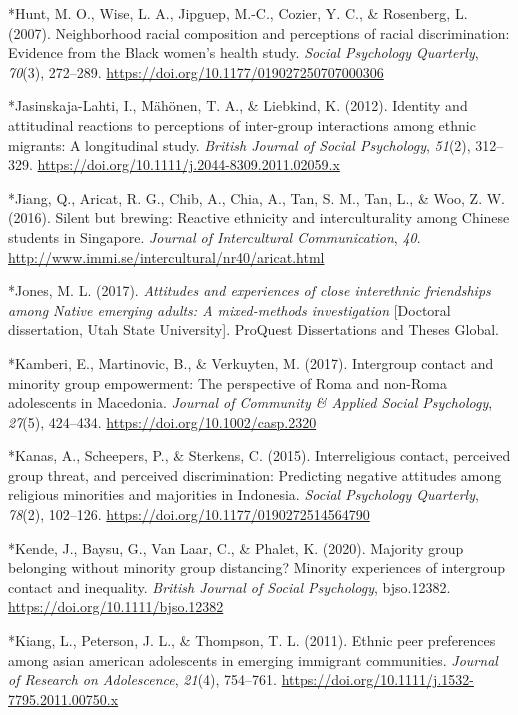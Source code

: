 \documentclass[12pt, letterpaper]{article}
\begin{document}
\leavevmode\hypertarget{ref-2001}{}%
*Hunt, M. O., Wise, L. A., Jipguep, M.-C., Cozier, Y. C., \& Rosenberg,
L. (2007). Neighborhood racial composition and perceptions of racial
discrimination: Evidence from the Black women's health study.
\emph{Social Psychology Quarterly}, \emph{70}(3), 272--289.
\url{https://doi.org/10.1177/019027250707000306}

\leavevmode\hypertarget{ref-2341}{}%
*Jasinskaja-Lahti, I., Mähönen, T. A., \& Liebkind, K. (2012). Identity
and attitudinal reactions to perceptions of inter-group interactions
among ethnic migrants: A longitudinal study. \emph{British Journal of
Social Psychology}, \emph{51}(2), 312--329.
\url{https://doi.org/10.1111/j.2044-8309.2011.02059.x}

\leavevmode\hypertarget{ref-19}{}%
*Jiang, Q., Aricat, R. G., Chib, A., Chia, A., Tan, S. M., Tan, L., \&
Woo, Z. W. (2016). Silent but brewing: Reactive ethnicity and
interculturality among Chinese students in Singapore. \emph{Journal of
Intercultural Communication}, \emph{40}.
\url{http://www.immi.se/intercultural/nr40/aricat.html}

\leavevmode\hypertarget{ref-303}{}%
*Jones, M. L. (2017). \emph{Attitudes and experiences of close
interethnic friendships among Native emerging adults: A mixed-methods
investigation} {[}Doctoral dissertation, Utah State University{]}.
ProQuest Dissertations and Theses Global.

\leavevmode\hypertarget{ref-856}{}%
*Kamberi, E., Martinovic, B., \& Verkuyten, M. (2017). Intergroup
contact and minority group empowerment: The perspective of Roma and
non-Roma adolescents in Macedonia. \emph{Journal of Community \& Applied
Social Psychology}, \emph{27}(5), 424--434.
\url{https://doi.org/10.1002/casp.2320}

\leavevmode\hypertarget{ref-1411}{}%
*Kanas, A., Scheepers, P., \& Sterkens, C. (2015). Interreligious
contact, perceived group threat, and perceived discrimination:
Predicting negative attitudes among religious minorities and majorities
in Indonesia. \emph{Social Psychology Quarterly}, \emph{78}(2),
102--126. \url{https://doi.org/10.1177/0190272514564790}

\leavevmode\hypertarget{ref-4002}{}%
*Kende, J., Baysu, G., Van Laar, C., \& Phalet, K. (2020). Majority
group belonging without minority group distancing? Minority experiences
of intergroup contact and inequality. \emph{British Journal of Social
Psychology}, bjso.12382. \url{https://doi.org/10.1111/bjso.12382}

\leavevmode\hypertarget{ref-1525}{}%
*Kiang, L., Peterson, J. L., \& Thompson, T. L. (2011). Ethnic peer
preferences among asian american adolescents in emerging immigrant
communities. \emph{Journal of Research on Adolescence}, \emph{21}(4),
754--761. \url{https://doi.org/10.1111/j.1532-7795.2011.00750.x}
\end{document}
